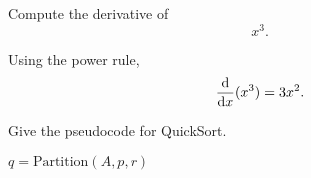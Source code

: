 \documentclass[12pt]{article}
\begin{document}
\renewcommand{\hmwkTitle}{Assignment 0}
\renewcommand{\hmwkDueDate}{February 14, 2037} %
\renewcommand{\hmwkClass}{Class Name}
\renewcommand{\hmwkClassInstructor}{Instructor Name}
\renewcommand{\hmwkAuthorName}{Your Name}

\maketitle

\pagebreak

\begin{homeworkProblem}
    Compute the derivative of 
    \begin{equation}
        x^3.
    \end{equation}

    \solution{}

    Using the power rule, 
    \begin{equation}
        \frac{\mathrm{d}}{\mathrm{d}x} (x^3) = 3x^2.
    \end{equation}
\end{homeworkProblem}

\begin{homeworkProblem}
    Give the pseudocode for QuickSort.

    \begin{algorithmic}[1]
            \State{} $q = \text{Partition}(A, p, r)$
            \State{} 
            \State{} 
        \EndIf{}
        \EndProcedure{}
    \end{algorithmic}
\end{homeworkProblem}
\end{document}
